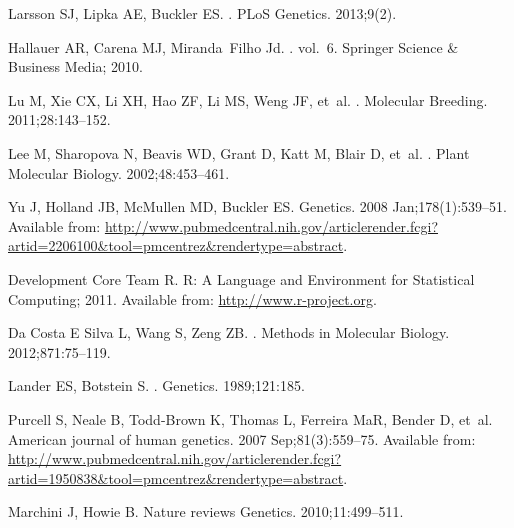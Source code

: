 \documentclass[10pt,letterpaper]{article}
\begin{document}
\begin{thebibliography}{10}
Larsson SJ, Lipka AE, Buckler ES.
.
\newblock PLoS Genetics. 2013;9(2).

Hallauer AR, Carena MJ, Miranda~Filho Jd.
. vol.~6.
\newblock Springer Science \& Business Media; 2010.

Lu M, Xie CX, Li XH, Hao ZF, Li MS, Weng JF, et~al.
.
\newblock Molecular Breeding. 2011;28:143--152.

Lee M, Sharopova N, Beavis WD, Grant D, Katt M, Blair D, et~al.
.
\newblock Plant Molecular Biology. 2002;48:453--461.

Yu J, Holland JB, McMullen MD, Buckler ES.
\newblock Genetics. 2008 Jan;178(1):539--51.
\newblock Available from:
  \url{http://www.pubmedcentral.nih.gov/articlerender.fcgi?artid=2206100\&tool=pmcentrez\&rendertype=abstract}.

{Development Core Team} R. {R: A Language and Environment for Statistical
  Computing}; 2011.
\newblock Available from: \url{http://www.r-project.org}.

{Da Costa E  Silva} L, Wang S, Zeng ZB.
.
\newblock Methods in Molecular Biology. 2012;871:75--119.

Lander ES, Botstein S.
.
\newblock Genetics. 1989;121:185.

Purcell S, Neale B, Todd-Brown K, Thomas L, Ferreira MaR, Bender D, et~al.
\newblock American journal of human genetics. 2007 Sep;81(3):559--75.
\newblock Available from:
  \url{http://www.pubmedcentral.nih.gov/articlerender.fcgi?artid=1950838\&tool=pmcentrez\&rendertype=abstract}.

Marchini J, Howie B.
\newblock Nature reviews Genetics. 2010;11:499--511.


\end{thebibliography}
\end{document}

